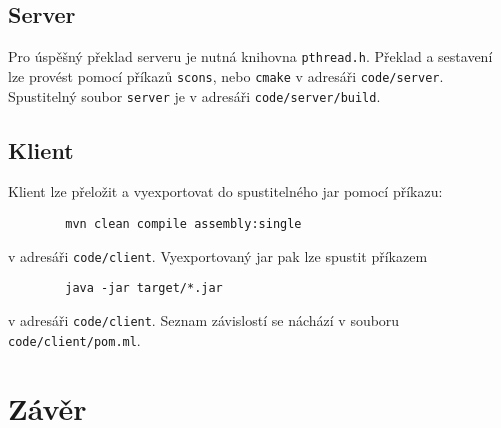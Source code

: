 \documentclass[11pt,a4paper]{scrartcl}
\begin{document}
	\subsection{Server}
	Pro úspěšný překlad serveru je nutná knihovna \verb|pthread.h|. Překlad a sestavení lze provést pomocí příkazů \verb|scons|, nebo \verb|cmake| v adresáři \verb|code/server|. Spustitelný soubor \verb|server| je v adresáři \verb|code/server/build|.
	\subsection{Klient}
	Klient lze přeložit a vyexportovat do spustitelného jar pomocí příkazu:
	\begin{lstlisting}
		mvn clean compile assembly:single
	\end{lstlisting}
	v adresáři \verb|code/client|. Vyexportovaný jar pak lze spustit příkazem
	\begin{lstlisting}
		java -jar target/*.jar
	\end{lstlisting} v adresáři \verb|code/client|. Seznam závislostí se náchází v souboru \verb|code/client/pom.ml|.
		
	\section{Závěr}
	
	
\end{document}
